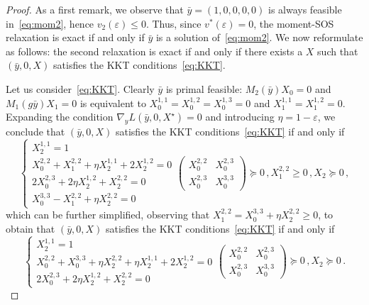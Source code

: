 \documentclass[a4paper,12pt]{article}
\begin{document}
\begin{proof}
{As a first remark, we observe that $\bar{y}=(1, 0, 0, 0, 0)$ is always feasible in~\eqref{eq:mom2}, hence $v_2(\varepsilon) \leq 0$.
Thus, since $v^*(\varepsilon) = 0$, 
the moment-SOS relaxation is exact
if and only if $\bar{y}$ is a solution of~\eqref{eq:mom2}.
We now reformulate as follows: the second relaxation
is exact if and only if there exists a $X$
such that $(\bar{y}, 0, X)$ satisfies the KKT conditions~\eqref{eq:KKT}.

Let us consider~\eqref{eq:KKT}.
Clearly $\bar{y}$ is primal feasible:
$M_{2}(\bar{y})X_0 = 0$ and $M_{1}(g\bar{y})X_1 = 0$
is equivalent to
$X_0^{1,1} = X_0^{1,2} = X_0^{1,3} = 0$ and 
$X_1^{1,1} = X_1^{1,2} = 0$.
Expanding the condition 
$\nabla_yL(\bar{y}, 0, X^\star) = 0$
and introducing $\eta = 1-\varepsilon$,
we conclude that $(\bar{y}, 0, X)$ satisfies the KKT conditions~\eqref{eq:KKT}
if and only if
\begin{equation}
	\begin{cases}
	X_2^{1,1} = 1 \\
	X_0^{2,2} + X_1^{2,2} + \eta X_2^{1,1} + 2X_2^{1,2} = 0 \\
	2X_0^{2,3} + 2\eta X_2^{1,2} + X_2^{2,2} = 0 \\
	X_0^{3,3} - X_1^{2,2} + \eta X_2^{2,2} = 0
	\end{cases} 
	\begin{pmatrix}
	X_0^{2,2} & X_0^{2,3} \\
	X_0^{2,3} & X_0^{3,3}
	\end{pmatrix} \succeq 0 \,, X_1^{2,2} \geq 0
	\,, X_2 \succeq 0 \,,
\end{equation}
which can be further simplified, observing
that $X_1^{2,2} = X_0^{3,3} + \eta X_2^{2,2} \geq 0$, to obtain that $(\bar{y}, 0, X)$ satisfies the KKT conditions~\eqref{eq:KKT}
if and only if
\begin{equation}
\label{eq:SDPfeasibility}
	\begin{cases}
	X_2^{1,1} = 1 \\
	X_0^{2,2} + X_0^{3,3} + \eta X_2^{2,2} + \eta X_2^{1,1} + 2X_2^{1,2} = 0 \\
	2X_0^{2,3} + 2\eta X_2^{1,2} + X_2^{2,2} = 0 	
	\end{cases} 
	\begin{pmatrix}
	X_0^{2,2} & X_0^{2,3} \\
	X_0^{2,3} & X_0^{3,3}
	\end{pmatrix} \succeq 0
	\,, X_2 \succeq 0 \,.
\end{equation}

}
\end{proof}
\end{document}
